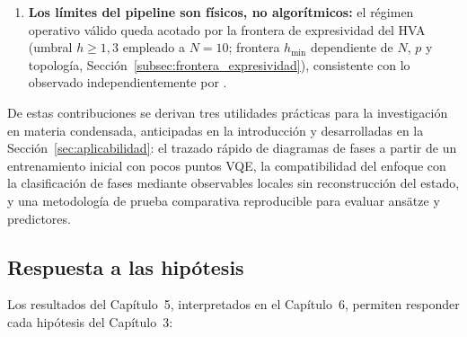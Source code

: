 \documentclass[11pt,a4paper,spanish]{book}
\begin{document}
\begin{enumerate}
    \item \textbf{Los límites del pipeline son físicos, no algorítmicos:} el régimen operativo válido queda acotado por la frontera de expresividad del HVA (umbral $h \geq 1,3$ empleado a $N = 10$; frontera $h_{\min}$ dependiente de $N$, $p$ y topología, Sección~\ref{subsec:frontera_expresividad}), consistente con lo observado independientemente por \citet{tripathi2026}.
\end{enumerate}

De estas contribuciones se derivan tres utilidades prácticas para la investigación en materia condensada, anticipadas en la introducción y desarrolladas en la Sección~\ref{sec:aplicabilidad}: el trazado rápido de diagramas de fases a partir de un entrenamiento inicial con pocos puntos VQE, la compatibilidad del enfoque con la clasificación de fases mediante observables locales sin reconstrucción del estado, y una metodología de prueba comparativa reproducible para evaluar ansätze y predictores.

\subsection{Respuesta a las hipótesis}

Los resultados del Capítulo~5, interpretados en el Capítulo~6, permiten responder cada hipótesis del Capítulo~3:
\end{document}
